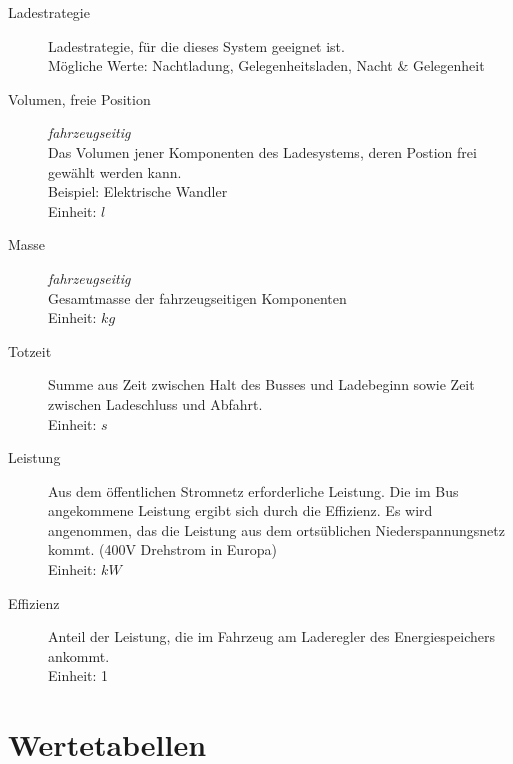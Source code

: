 \begin{description}
	\item [Ladestrategie] Ladestrategie, für die dieses System geeignet ist.\\
	Mögliche Werte: Nachtladung, Gelegenheitsladen, Nacht \& Gelegenheit
	\item [Volumen, freie Position] \emph{fahrzeugseitig}\\
	Das Volumen jener Komponenten des Ladesystems, deren Postion frei gewählt werden kann.\\
	Beispiel: Elektrische Wandler\\
	Einheit: $l$
	\item [Masse] \emph{fahrzeugseitig}\\
	Gesamtmasse der fahrzeugseitigen Komponenten\\
	Einheit: $kg$
	\item [Totzeit]
	Summe aus Zeit zwischen Halt des Busses und Ladebeginn sowie Zeit zwischen Ladeschluss und Abfahrt.\\
	Einheit: $s$
	\item [Leistung]
	Aus dem öffentlichen Stromnetz erforderliche Leistung. Die im Bus angekommene Leistung ergibt sich durch die Effizienz. Es wird angenommen, das die Leistung aus dem ortsüblichen Niederspannungsnetz kommt. (400V Drehstrom in Europa)\\
	Einheit: $kW$
	\item [Effizienz]
	Anteil der Leistung, die im Fahrzeug am Laderegler des Energiespeichers ankommt.\\
	Einheit: 1
\end{description}


\section{Wertetabellen}
\label{sec_tabellen_ladesysteme}
\FloatBarrier
